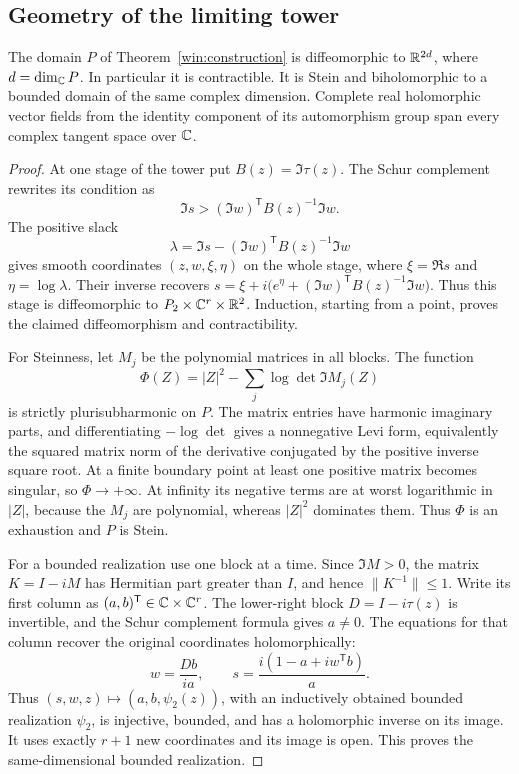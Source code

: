 \subsection{Geometry of the limiting tower}

\begin{proposition}\label{win:tower-properties}
The domain $P$ of Theorem~\ref{win:construction} is diffeomorphic
to $\mathbb R^{2d}$, where $d=\dim_{\mathbb C}P$.  In particular it is
contractible.  It is Stein and biholomorphic to a bounded domain
of the same complex dimension.  Complete real holomorphic vector fields from
the identity component of its automorphism group span every
complex tangent space over $\mathbb C$.
\end{proposition}

\begin{proof}
At one stage of the tower put $B(z)=\Im\tau(z)$.  The Schur
complement rewrites its condition as
\[
       \Im s>(\Im w)^{\mathsf T}B(z)^{-1}\Im w.
\]
The positive slack
\[
 \lambda=\Im s-(\Im w)^{\mathsf T}B(z)^{-1}\Im w
\]
gives smooth coordinates $(z,w,\xi,\eta)$ on the whole stage,
where $\xi=\Re s$ and $\eta=\log\lambda$.  Their inverse recovers
$s=\xi+i\bigl(e^\eta+
(\Im w)^{\mathsf T}B(z)^{-1}\Im w\bigr)$.
Thus this stage is diffeomorphic to
$P_2\times\mathbb C^r\times\mathbb R^2$.  Induction, starting from a point,
proves the claimed diffeomorphism and contractibility.

For Steinness, let $M_j$ be the polynomial matrices in all blocks.
The function
\[
             \Phi(Z)=|Z|^2-\sum_j\log\det\Im M_j(Z)
\]
is strictly plurisubharmonic on $P$.  The matrix entries have
harmonic imaginary parts, and differentiating $-\log\det$ gives
a nonnegative Levi form, equivalently the squared matrix norm
of the derivative conjugated by the positive inverse square
root.  At a finite boundary point at least one positive matrix
becomes singular, so $\Phi\to+\infty$.  At infinity its negative
terms are at worst logarithmic in $|Z|$, because the $M_j$ are
polynomial, whereas $|Z|^2$ dominates them.  Thus $\Phi$ is an
exhaustion and $P$ is Stein.

For a bounded realization use one block at a time.  Since
$\Im M>0$, the matrix $K=I-iM$ has Hermitian part greater than
$I$, and hence $\|K^{-1}\|\le1$.  Write its first column as
$(a,b)^{\mathsf T}\in\mathbb C\times\mathbb C^r$.  The lower-right block
$D=I-i\tau(z)$ is invertible, and the Schur complement formula
gives $a\ne0$.  The equations for that column recover the original
coordinates holomorphically:
\[
       w=\frac{Db}{ia},\qquad
       s=\frac{i(1-a+iw^{\mathsf T}b)}{a}.
\]
Thus $(s,w,z)\mapsto(a,b,\psi_2(z))$, with an inductively obtained
bounded realization $\psi_2$, is injective, bounded, and has a
holomorphic inverse on its image.  It uses exactly $r+1$ new
coordinates and its image is open.  This proves the
same-dimensional bounded realization.


\end{proof}
